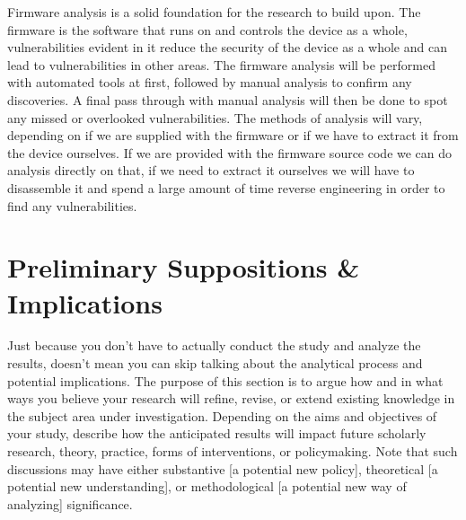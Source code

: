 \documentclass[10pt,twocolumn,letterpaper]{article}
\begin{document}
Firmware analysis is a solid foundation for the research to build upon.  The firmware is the software that runs on and controls the device as a whole, vulnerabilities evident in it reduce the security of the device as a whole and can lead to vulnerabilities in other areas.  The firmware analysis will be performed with automated tools at first, followed by manual analysis to confirm any discoveries.  A final pass through with manual analysis will then be done to spot any missed or overlooked vulnerabilities.  The methods of analysis will vary, depending on if we are supplied with the firmware or if we have to extract it from the device ourselves.  If we are provided with the firmware source code we can do analysis directly on that, if we need to extract it ourselves we will have to disassemble it and spend a large amount of time reverse engineering in order to find any vulnerabilities.

\section{Preliminary Suppositions \& Implications}
Just because you don't have to actually conduct the study and analyze the results, doesn't mean you can skip talking about the analytical process and potential implications. The purpose of this section is to argue how and in what ways you believe your research will refine, revise, or extend existing knowledge in the subject area under investigation. Depending on the aims and objectives of your study, describe how the anticipated results will impact future scholarly research, theory, practice, forms of interventions, or policymaking. Note that such discussions may have either substantive [a potential new policy], theoretical [a potential new understanding], or methodological [a potential new way of analyzing] significance.
 
\end{document}
